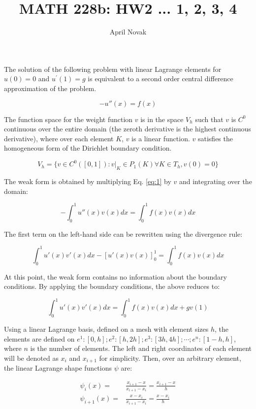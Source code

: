\documentclass[10pt]{article}
\newcommand{\beq}{\begin{equation}}
\newcommand{\eeq}{\end{equation}}
\newcommand{\beqa}{\begin{equation}\begin{aligned}}
\newcommand{\eeqa}{\end{aligned}\end{equation}}
\begin{document}
\title{MATH 228b: HW2 ... 1, 2, 3, 4}
\author{April Novak}

\maketitle

\section{}

The solution of the following problem with linear Lagrange elements for \(u(0)=0\) and \(u^{'}(1)=g\) is equivalent to a second order central difference approximation of the problem. 

\beq
\label{eq:1}
-u''(x)=f(x)
\eeq

The function space for the weight function \(v\) is in the space \(V_h\) such that \(v\) is \(C^0\) continuous over the entire domain (the zeroth derivative is the highest continuous derivative), where over each element \(K\), \(v\) is a linear function. \(v\) satisfies the homogeneous form of the Dirichlet boundary condition.

\beq
V_h=\{v\in C^0([0,1]): v\rvert_K\in P_1(K) \forall K\in T_h, v(0)=0\}
\eeq

The weak form is obtained by multiplying Eq. \eqref{eq:1} by \(v\) and integrating over the domain:

\beq
-\int_0^1 u''(x)v(x)dx=\int_0^1 f(x)v(x)dx
\eeq

The first term on the left-hand side can be rewritten using the divergence rule:

\beq
\int_0^1 u'(x)v'(x)dx-\left\lbrack u'(x)v(x)\right\rbrack_0^1=\int_0^1 f(x)v(x)dx
\eeq

At this point, the weak form contains no information about the boundary conditions. By applying the boundary conditions, the above reduces to:

\beq
\int_0^1 u'(x)v'(x)dx=\int_0^1 f(x)v(x)dx+gv(1)
\eeq

Using a linear Lagrange basis, defined on a mesh with element sizes \(h\), the elements are defined on \(e^1: [0, h]; e^2: [h, 2h]; e^3: [3h, 4h]; \cdots; e^n: [1-h, h]\), where \(n\) is the number of elements. The left and right coordinates of each element will be denoted as \(x_i\) and \(x_{i+1}\) for simplicity. Then, over an arbitrary element, the linear Lagrange shape functions \(\psi\) are:

\beqa
\psi_i(x)=& \frac{x_{i+1}-x}{x_{i+1}-x_i}=\frac{x_{i+1}-x}{h}\\
\psi_{i+1}(x) =& \frac{x-x_i}{x_{i+1}-x_i}=\frac{x-x_i}{h}\\
\eeqa
\end{document}
